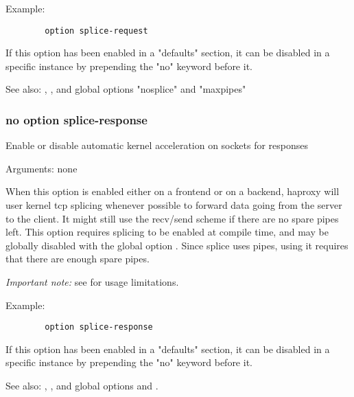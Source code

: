   Example:
  \begin{verbatim}
        option splice-request
  \end{verbatim}
  
  If this option has been enabled in a "defaults" section, it can be disabled
  in a specific instance by prepending the "no" keyword before it.


See also: , , and global options
             "nosplice" and "maxpipes"

\subsubsection[splice-response]{}
\subsubsection*{no option splice-response}


  Enable or disable automatic kernel acceleration on sockets for responses


  Arguments: none

  When this option is enabled either on a frontend or on a backend, haproxy
  will user kernel tcp splicing whenever possible to forward data going from
  the server to the client. It might still use the recv/send scheme if there
  are no spare pipes left. This option requires splicing to be enabled at
  compile time, and may be globally disabled with the global option .
  Since splice uses pipes, using it requires that there are enough spare pipes.

  \emph{Important note:} see  for usage limitations.

  Example:
  \begin{verbatim}
        option splice-response
  \end{verbatim}

  If this option has been enabled in a "defaults" section, it can be disabled
  in a specific instance by prepending the "no" keyword before it.


See also: , , and global options
              and .

\subsubsection[srvtcpka]{}
